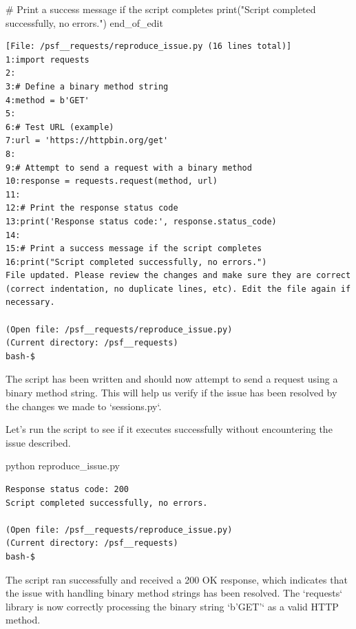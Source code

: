 {\begin{agentbox}
\begin{CodeVerbatim}[breaklines=true, breakanywhere=true]
# Print a success message if the script completes
print("Script completed successfully, no errors.")
end_of_edit
\end{CodeVerbatim}
\end{agentbox}
\begin{observationbox}\begin{Verbatim}[breaklines=true, breakanywhere=true]
[File: /psf__requests/reproduce_issue.py (16 lines total)]
1:import requests
2:
3:# Define a binary method string
4:method = b'GET'
5:
6:# Test URL (example)
7:url = 'https://httpbin.org/get'
8:
9:# Attempt to send a request with a binary method
10:response = requests.request(method, url)
11:
12:# Print the response status code
13:print('Response status code:', response.status_code)
14:
15:# Print a success message if the script completes
16:print("Script completed successfully, no errors.")
File updated. Please review the changes and make sure they are correct (correct indentation, no duplicate lines, etc). Edit the file again if necessary.

(Open file: /psf__requests/reproduce_issue.py)
(Current directory: /psf__requests)
bash-$
\end{Verbatim}
\end{observationbox}
\begin{agentbox}
The script has been written and should now attempt to send a request using a binary method string. This will help us verify if the issue has been resolved by the changes we made to `sessions.py`.



Let's run the script to see if it executes successfully without encountering the issue described.

\hrulefill
\begin{CodeVerbatim}[breaklines=true, breakanywhere=true]
python reproduce_issue.py
\end{CodeVerbatim}
\end{agentbox}
\begin{observationbox}\begin{Verbatim}[breaklines=true, breakanywhere=true]
Response status code: 200
Script completed successfully, no errors.

(Open file: /psf__requests/reproduce_issue.py)
(Current directory: /psf__requests)
bash-$
\end{Verbatim}
\end{observationbox}
\begin{agentbox}
The script ran successfully and received a 200 OK response, which indicates that the issue with handling binary method strings has been resolved. The `requests` library is now correctly processing the binary string `b'GET'` as a valid HTTP method.




\end{agentbox}}
